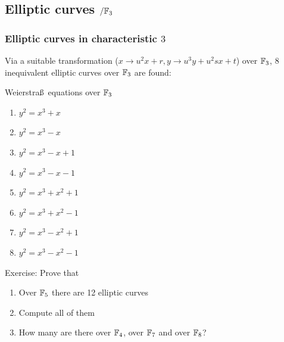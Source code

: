 \documentclass[10pt,handout]{beamer} %
\begin{document}
\subsection{Elliptic curves \texorpdfstring{$/\mathbb F_3$}{F3}}
\begin{frame}
\frametitle{Elliptic curves in characteristic $3$}

Via a suitable transformation ($x\rightarrow u^2x+r, y\rightarrow u^3y+u^2sx+t$) over $\mathbb F_3$,  $8$ inequivalent
elliptic curves over $\mathbb F_3$ are found:\pause

\begin{beamerboxesrounded}[upper=block title example,lower=block body alerted,shadow=true]{Weierstra\ss\ equations over $\mathbb F_3$}
\begin{enumerate}
 \item $y^2=x^3+x$
 \item$y^2=x^3 - x$
 \item$y^2=x^3 - x +1$
 \item$y^2=x^3 - x -1$
 \item$y^2=x^3 + x^2 + 1$
 \item$y^2=x^3 + x^2 - 1$
 \item$y^2=x^3 - x^2 + 1$
 \item$y^2=x^3 - x^2 - 1$
 \end{enumerate}
\end{beamerboxesrounded}\pause

\begin{block}{Exercise: Prove that}
\begin{enumerate}[<+-| alert@+>]
\item Over  $\mathbb F_5$ there are 12 elliptic curves
          \item Compute all of them
           \item How many are there over $\mathbb F_4$, over $\mathbb F_7$ and over $\mathbb F_8$?
         \end{enumerate}
\end{block}



\end{frame}
\end{document}
